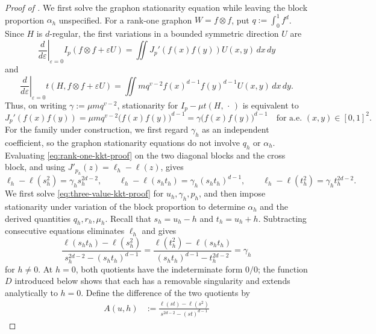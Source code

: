 \begin{proof}[Proof of ]
We first solve the graphon stationarity equation while leaving the block
proportion $\alpha_h$ unspecified.  For a rank-one graphon $W=f\otimes f$,
put $q:=\int_0^1 f^d$.  Since $H$ is $d$-regular, the first variations in a
bounded symmetric direction $U$ are
\[
  \left.\frac{d}{d\varepsilon}\right|_{\varepsilon=0}
  I_p(f\otimes f+\varepsilon U)
  =\iint J_p'(f(x)f(y))U(x,y)\,dx\,dy
\]
and
\[
  \left.\frac{d}{d\varepsilon}\right|_{\varepsilon=0}
  t(H,f\otimes f+\varepsilon U)
  =\iint m q^{v-2}f(x)^{d-1}f(y)^{d-1}U(x,y)\,dx\,dy.
\]
Thus, on writing $\gamma:=\mu m q^{v-2}$, stationarity for
$I_p-\mu t(H,\,\cdot\,)$ is equivalent to
\begin{equation}\label{eq:rank-one-kkt-proof}
  J_p'(f(x)f(y))
  =\mu m q^{v-2}\bigl(f(x)f(y)\bigr)^{d-1}
  =\gamma\bigl(f(x)f(y)\bigr)^{d-1}
  \quad\text{for a.e. }(x,y)\in[0,1]^2.
\end{equation}
For the family under construction, we first regard $\gamma_h$ as an
independent coefficient, so the graphon stationarity equations do not
involve $q_h$ or $\alpha_h$.  Evaluating
\eqref{eq:rank-one-kkt-proof} on the two diagonal blocks and
the cross block, and using $J'_{p_h}(z)=\ell_h-\ell(z)$, gives
\begin{equation}\label{eq:three-value-kkt-proof}
  \ell_h-\ell(s_h^2)=\gamma_hs_h^{2d-2},\qquad
  \ell_h-\ell(s_ht_h)=\gamma_h(s_ht_h)^{d-1},\qquad
  \ell_h-\ell(t_h^2)=\gamma_ht_h^{2d-2}.
\end{equation}
We first solve \eqref{eq:three-value-kkt-proof} for
$u_h,\gamma_h,p_h$, and then impose stationarity under variation of the block
proportion to determine $\alpha_h$ and the derived quantities
$q_h,r_h,\mu_h$.
Recall that $s_h=u_h-h$ and $t_h=u_h+h$.  Subtracting consecutive equations
eliminates $\ell_h$ and gives
\begin{equation}\label{eq:kkt-divided-slopes}
  \frac{\ell(s_ht_h)-\ell(s_h^2)}
       {s_h^{2d-2}-(s_ht_h)^{d-1}}
  =\frac{\ell(t_h^2)-\ell(s_ht_h)}
       {(s_ht_h)^{d-1}-t_h^{2d-2}}
  =\gamma_h
\end{equation}
for $h\ne0$.
At $h=0$, both quotients have the
indeterminate form $0/0$; the function $D$ introduced below shows that each
has a removable singularity and extends analytically to $h=0$.
Define the difference of the two quotients by
\begin{equation*}
\begin{aligned}
  A(u,h)
  &:=\frac{\ell(st)-\ell(s^2)}
            {s^{2d-2}-(st)^{d-1}}

\end{aligned}
\end{equation*}
\end{proof}
